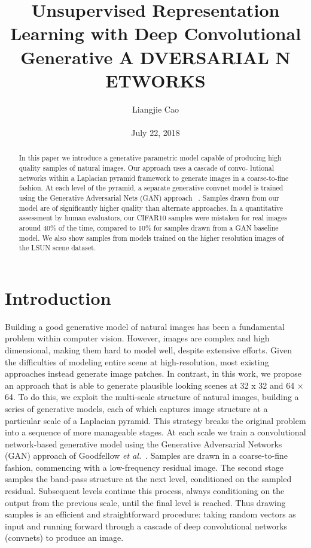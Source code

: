 \documentclass[10pt,twocolumn,letterpaper]{article}
\begin{document}
\title{\textbf{Unsupervised Representation Learning with Deep Convolutional	Generative A DVERSARIAL N ETWORKS}}
\author{Liangjie Cao\\\\ July 22, 2018}
\maketitle
\begin{abstract}
In this paper we introduce a generative parametric model capable of producing
high quality samples of natural images. Our approach uses a cascade of convo-
lutional networks within a Laplacian pyramid framework to generate images in
a coarse-to-fine fashion. At each level of the pyramid, a separate generative convnet model is trained using the Generative Adversarial Nets (GAN) approach ~\cite{name10}. Samples drawn from our model are of significantly higher quality than alternate approaches. In a quantitative assessment by human evaluators, our CIFAR10 samples were mistaken for real images around 40\% of the time, compared to 10\% for samples drawn from a GAN baseline model. We also show samples from models trained on the higher resolution images of the LSUN scene dataset.
\end{abstract}
\section{Introduction}
Building a good generative model of natural images has been a fundamental problem within computer vision. However, images are complex and high dimensional, making them hard to model well, despite extensive efforts. Given the difficulties of modeling entire scene at high-resolution,
most existing approaches instead generate image patches. In contrast, in this work, we propose an approach that is able to generate plausible looking scenes at 32 x 32 and 64 × 64. To do this, we exploit the multi-scale structure of natural images, building a series of generative models, each of which captures image structure at a particular scale of a Laplacian pyramid. This strategy
breaks the original problem into a sequence of more manageable stages. At each scale we train a convolutional network-based generative model using the Generative Adversarial Networks (GAN) approach of Goodfellow \emph{et al.}~\cite{name10}. Samples are drawn in a coarse-to-fine fashion, commencing with a low-frequency residual image. The second stage samples the band-pass structure at the next level, conditioned on the sampled residual. Subsequent levels continue this process, always conditioning on the output from the previous scale, until the final level is reached. Thus drawing samples is an efficient and straightforward procedure: taking random vectors as input and running forward through a cascade of deep convolutional networks (convnets) to produce an image.
\end{document}
